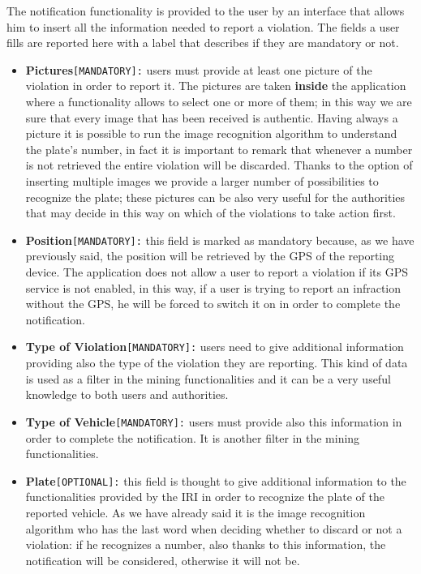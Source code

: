 		The notification functionality is provided to the user by an interface that allows him to insert all the information needed to report a violation. The fields a user fills are reported here with a label that describes if they are mandatory or not.
		
		\begin{itemize}
			\item \textbf{Pictures}\texttt{[MANDATORY]:} users must provide at least one picture of the violation in order to report it. The pictures are taken \textbf{inside} the application where a functionality allows to select one or more of them; in this way we are sure that every image that has been received is authentic. Having always a picture it is possible to run the image recognition algorithm to understand the plate's number, in fact it is important to remark that whenever a number is not retrieved the entire violation will be discarded. Thanks to the option of inserting multiple images we provide a larger number of possibilities to recognize the plate; these pictures can be also very useful for the authorities that may decide in this way on which of the violations to take action first.
			
			\item \textbf{Position}\texttt{[MANDATORY]:} this field is marked as mandatory because, as we have previously said, the position will be retrieved by the GPS of the reporting device. The application does not allow a user to report a violation if its GPS service is not enabled, in this way, if a user is trying to report an infraction without the GPS, he will be forced to switch it on in order to complete the notification.
			
			\item \textbf{Type of Violation}\texttt{[MANDATORY]:} users need to give additional information providing also the type of the violation they are reporting. This kind of data is used as a filter in the mining functionalities and it can be a very useful knowledge to both users and authorities.
			
			\item \textbf{Type of Vehicle}\texttt{[MANDATORY]:} users must provide also this information in order to complete the notification. It is another filter in the mining functionalities.
			
			\item \textbf{Plate}\texttt{[OPTIONAL]:} this field is thought to give additional information to the functionalities provided by the IRI in order to recognize the plate of the reported vehicle. As we have already said it is the image recognition algorithm who has the last word when deciding whether to discard or not a violation: if he recognizes a number, also thanks to this information, the notification will be considered, otherwise it will not be.
		\end{itemize}
	
